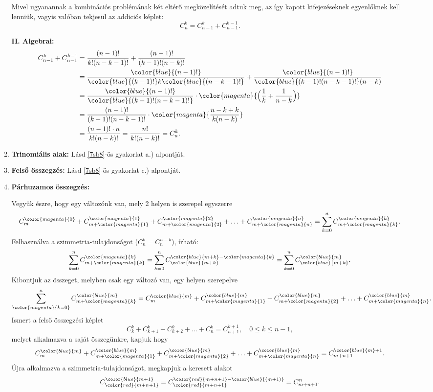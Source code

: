 \begin{enumerate}
\begin{enumerate}
\begin{enumerate}
\end{enumerate}
Mivel ugyanannak a kombinációs problémának két eltérő megközelítését
adtuk meg, az így kapott kifejezéseknek egyenlőknek kell lenniük,
vagyis valóban tekjesül az addiciós képlet: 
\[
C_{n}^{k}=C_{n-1}^{k}+C_{n-1}^{k-1}.
\]

\textbf{II. Algebrai:} 
\[
\begin{aligned}C_{n-1}^{k}+C_{n-1}^{k-1} & =\frac{(n-1)!}{k!(n-k-1)!}+\frac{(n-1)!}{(k-1)!(n-k)!}\\
 & =\frac{{\color{blue}{(n-1)!}}}{{\color{blue}{(k-1)!}}k{\color{blue}{(n-k-1)!}}}+\frac{{\color{blue}{(n-1)!}}}{{\color{blue}{(k-1)!(n-k-1)!}}(n-k)}\\
 & =\frac{{\color{blue}{(n-1)!}}}{{\color{blue}{(k-1)!(n-k-1)!}}}\cdot{\color{magenta}{\Big(\frac{1}{k}+\frac{1}{n-k}\Big)}}\\
 & =\frac{(n-1)!}{(k-1)!(n-k-1)!}\cdot{\color{magenta}{\frac{n-k+k}{k(n-k)}}}\\
 & =\frac{(n-1)!\cdot n}{k!(n-k)!}=\frac{n!}{k!(n-k)!}=C_{n}^{k}.
\end{aligned}
\]

\item \textbf{Trinomiális alak:} Lásd \ref{7sb8}-ös gyakorlat a.) alpontját. 
\item \textbf{Felső összegzés:} Lásd \ref{7sb8}-ös gyakorlat c.) alpontját. 
\item \textbf{Párhuzamos összegzés:}

Vegyük észre, hogy egy változónk van, mely 2 helyen is szerepel egyszerre
\[
C_{m}^{{\color{magenta}{0}}}+C_{m+{\color{magenta}{1}}}^{{\color{magenta}{1}}}+C_{m+{\color{magenta}{2}}}^{{\color{magenta}{2}}}+\ldots+C_{m+{\color{magenta}{n}}}^{{\color{magenta}{n}}}=\sum_{k=0}^{n}C_{m+{\color{magenta}{k}}}^{{\color{magenta}{k}}}.
\]
Felhasználva a szimmetria-tulajdonságot ($C_{n}^{k}=C_{n}^{n-k}$),
írható: 
\[
\sum_{k=0}^{n}C_{m+{\color{magenta}{k}}}^{{\color{magenta}{k}}}=\sum_{k=0}^{n}C_{{\color{blue}{m+k}}}^{{\color{blue}{m+k}}-{\color{magenta}{k}}}=\sum_{k=0}^{n}C_{{\color{blue}{m+k}}}^{{\color{blue}{m}}}.
\]
Kibontjuk az összeget, melyben csak egy változó van, egy helyen szerepelve
\[
\sum_{{\color{magenta}{k=0}}}^{n}C_{m+{\color{magenta}{k}}}^{{\color{blue}{m}}}=C_{m}^{{\color{blue}{m}}}+C_{m+{\color{magenta}{1}}}^{{\color{blue}{m}}}+C_{m+{\color{magenta}{2}}}^{{\color{blue}{m}}}+\ldots+C_{m+{\color{magenta}{n}}}^{{\color{blue}{m}}}.
\]
Ismert a felső összegzési képlet 
\[
C_{k}^{k}+C_{k+1}^{k}+C_{k+2}^{k}+\ldots+C_{n}^{k}=C_{n+1}^{k+1},\quad0\leq k\leq n-1,
\]
melyet alkalmazva a saját összegünkre, kapjuk hogy 
\[
C_{m}^{{\color{blue}{m}}}+C_{m+{\color{magenta}{1}}}^{{\color{blue}{m}}}+C_{m+{\color{magenta}{2}}}^{{\color{blue}{m}}}+\ldots+C_{m+{\color{magenta}{n}}}^{{\color{blue}{m}}}=C_{m+n+1}^{{\color{blue}{m}}+1}.
\]
Újra alkalmazva a szimmetria-tulajdonságot, megkapjuk a keresett alakot
\[
C_{{\color{red}{m+n+1}}}^{{\color{blue}{m+1}}}=C_{{\color{red}{m+n+1}}}^{{\color{red}{m+n+1}}-{\color{blue}{(m+1)}}}=C_{m+n+1}^{n}.
\]


\end{enumerate}
\end{enumerate}
